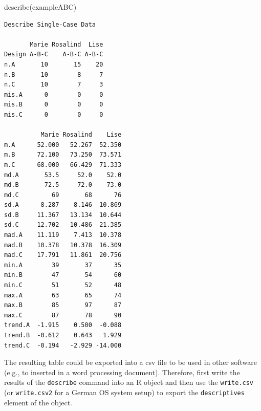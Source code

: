 \documentclass[
  letterpaper,
  DIV=11,
  numbers=noendperiod]{scrreprt}
\newenvironment{Shaded}{\begin{snugshade}}{\end{snugshade}}
\newcommand{\AttributeTok}[1]{\textcolor[rgb]{0.40,0.45,0.13}{#1}}
\newcommand{\CommentTok}[1]{\textcolor[rgb]{0.37,0.37,0.37}{#1}}
\newcommand{\FunctionTok}[1]{\textcolor[rgb]{0.28,0.35,0.67}{#1}}
\newcommand{\NormalTok}[1]{\textcolor[rgb]{0.00,0.23,0.31}{#1}}
\newcommand{\OtherTok}[1]{\textcolor[rgb]{0.00,0.23,0.31}{#1}}
\newcommand{\SpecialCharTok}[1]{\textcolor[rgb]{0.37,0.37,0.37}{#1}}
\newcommand{\StringTok}[1]{\textcolor[rgb]{0.13,0.47,0.30}{#1}}
\begin{document}
\begin{Shaded}
\begin{Highlighting}[]
\FunctionTok{describe}\NormalTok{(exampleABC)}
\end{Highlighting}
\end{Shaded}

\begin{verbatim}
Describe Single-Case Data

       Marie Rosalind  Lise
Design A-B-C    A-B-C A-B-C
n.A       10       15    20
n.B       10        8     7
n.C       10        7     3
mis.A      0        0     0
mis.B      0        0     0
mis.C      0        0     0

          Marie Rosalind    Lise
m.A      52.000   52.267  52.350
m.B      72.100   73.250  73.571
m.C      68.000   66.429  71.333
md.A       53.5     52.0    52.0
md.B       72.5     72.0    73.0
md.C         69       68      76
sd.A      8.287    8.146  10.869
sd.B     11.367   13.134  10.644
sd.C     12.702   10.486  21.385
mad.A    11.119    7.413  10.378
mad.B    10.378   10.378  16.309
mad.C    17.791   11.861  20.756
min.A        39       37      35
min.B        47       54      60
min.C        51       52      48
max.A        63       65      74
max.B        85       97      87
max.C        87       78      90
trend.A  -1.915    0.500  -0.088
trend.B  -0.612    0.643   1.929
trend.C  -0.194   -2.929 -14.000
\end{verbatim}

The resulting table could be exported into a csv file to be used in
other software (e.g., to inserted in a word processing document).
Therefore, first write the results of the \texttt{describe} command into
an R object and then use the \texttt{write.csv} (or \texttt{write.csv2}
for a German OS system setup) to export the \texttt{descriptives}
element of the object.

\begin{Shaded}
\end{Shaded}
\end{document}
